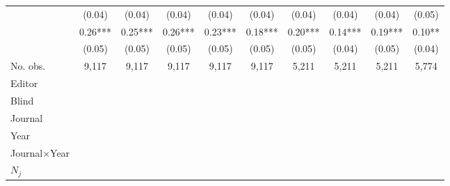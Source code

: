 \begin{table}
\begin{threeparttable}
\begin{tabular}{p{3cm}S@{}S@{}S@{}S@{}S@{}S@{}S@{}S@{}S@{}}
                                          &      (0.04)   &      (0.04)   &      (0.04)   &      (0.04)   &      (0.04)   &      (0.04)   &      (0.04)   &      (0.04)   &      (0.05)   \\
            &        0.26***&        0.25***&        0.26***&        0.23***&        0.18***&        0.20***&        0.14***&        0.19***&        0.10** \\
                                          &      (0.05)   &      (0.05)   &      (0.05)   &      (0.05)   &      (0.05)   &      (0.05)   &      (0.04)   &      (0.05)   &      (0.04)   \\
            \midrule
            No. obs.                      &       9,117   &       9,117   &       9,117   &       9,117   &       9,117   &       5,211   &       5,211   &       5,211   &       5,774   \\
            \midrule
            Editor                &           {}   &           {}   &           {}   &           {}   &           {}   &           {}   &           {}   &           {}   &           {}   \\
            Blind                         &           {}   &           {}   &           {}   &           {}   &           {}   &           {}   &           {}   &           {}   &           {}   \\
            Journal                       &           {}   &           {}   &               &               &               &               &               &               &               \\
            Year                          &               &           {}   &               &               &               &               &               &               &               \\
            Journal\(\times\)Year                  &               &               &           {}   &           {}   &           {}   &           {}   &           {}   &           {}   &           {}   \\
            \(N_j\)                       &               &               &               &           {}   &           {}   &           {}   &           {}   &           {}   &           {}   \\

\end{tabular}
\end{threeparttable}
\end{table}
